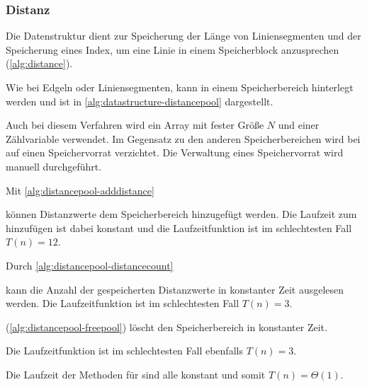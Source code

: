\subsubsection{Distanz} %
\label{sub:distanz}

Die Datenstruktur  dient zur Speicherung der Länge von Liniensegmenten und der Speicherung eines
 Index, um eine Linie in einem Speicherblock anzusprechen (\autoref{alg:distance}).


Wie bei Edgeln oder Liniensegmenten, kann  in einem Speicherbereich hinterlegt werden und ist
 in \autoref{alg:datastructure-distancepool} dargestellt.

Auch bei diesem Verfahren wird ein Array mit fester Größe $N$ und einer Zählvariable verwendet. Im Gegensatz zu den
 anderen Speicherbereichen wird bei  auf einen Speichervorrat verzichtet. Die Verwaltung eines
 Speichervorrat wird manuell durchgeführt.

Mit \autoref{alg:distancepool-adddistance}

können Distanzwerte dem Speicherbereich hinzugefügt werden. Die Laufzeit zum hinzufügen ist dabei konstant und die
 Laufzeitfunktion ist im schlechtesten Fall $T(n) = 12$.

Durch \autoref{alg:distancepool-distancecount}

 kann die Anzahl der gespeicherten Distanzwerte in konstanter Zeit ausgelesen werden. Die Laufzeitfunktion ist im schlechtesten Fall $T(n) = 3$.

 (\autoref{alg:distancepool-freepool}) löscht den Speicherbereich in konstanter Zeit.

Die Laufzeitfunktion ist im schlechtesten Fall ebenfalls $T(n) = 3$.

Die Laufzeit der Methoden für  sind alle konstant und somit $T(n)=\Theta(1)$.

